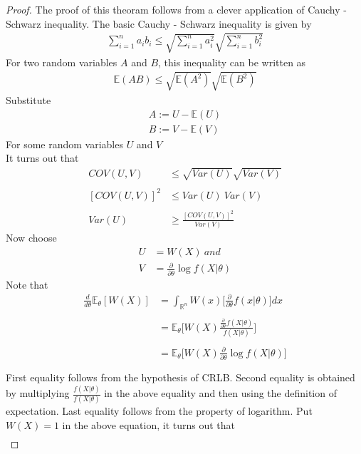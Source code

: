 \documentclass[a4paper,english,12pt]{article}
\begin{document}
\begin{proof}
The proof of this theoram follows from a clever application of Cauchy - Schwarz inequality. The basic Cauchy - Schwarz inequality is given by
\begin{align*}
\sum_{i=1}^{n} a_i b_i \leq \sqrt{\sum_{i=1}^{n} a_i^2}\sqrt{\sum_{i=1}^{n} b_i^2}
\end{align*}
For two random variables $A$ and $B$, this inequality can be written as
\begin{align*}
\mathbb{E}(AB) \leq \sqrt{\mathbb{E}(A^2)}\sqrt{\mathbb{E}(B^2)}
\end{align*} 
Substitute 
\begin{align*}
A := U - \mathbb{E}(U)\\
B := V - \mathbb{E}(V)
\end{align*}
For some random variables $U$ and $V$\\
It turns out that 
\begin{align*}
COV(U,V) & \leq \sqrt{Var(U)} \sqrt{Var(V)}\\\\
[COV(U,V)]^2 & \leq Var(U) \  Var(V)\\\\
Var(U) & \geq \frac{[COV(U,V)]^2}{Var(V)}
\end{align*}
Now choose 
\begin{align*}
U &= W(X) \  and\\
V &= \frac{\partial}{\partial \theta} \log f(X | \theta)
\end{align*}
Note that
\begin{align*}
\frac{d}{d\theta}\mathbb{E}_\theta[W(X)] &= \int_{\mathbb{R}^n} W(x) \Big[\frac{\partial}{\partial \theta}f(x | \theta)\Big] dx\\\\
&= \mathbb{E}_\theta \Big[ W(X) \frac{\frac{\partial}{\partial \theta}f(X | \theta)}{f(X | \theta)} \Big]\\\\
&= \mathbb{E}_\theta \Big[ W(X) \frac{\partial}{\partial \theta}\log f(X | \theta) \Big]\\\\
\end{align*}
First equality follows from the hypothesis of CRLB. Second equality is obtained by multiplying $\frac{f(X|\theta)}{f(X|\theta)}$ in the above equality and then using the definition of expectation. Last equality follows from the property of logarithm.  
Put $W(X) = 1$ in the above equation, it turns out that
\begin{align*}

\end{align*}
\end{proof}
\end{document}
